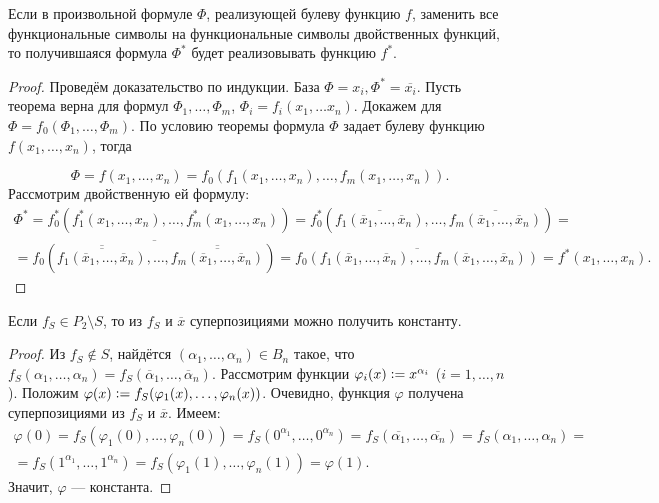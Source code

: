 \begin{theorem}
    Если в произвольной формуле $\Phi$, реализующей булеву функцию $f$, заменить все функциональные символы на функциональные символы двойственных функций, то получившаяся формула $\Phi^\ast$ будет реализовывать функцию $f^\ast$.
\end{theorem}

\begin{proof}
    Проведём доказательство по индукции. База $\Phi = x_i, \Phi^\ast = \overline{x_i}$. Пусть теорема верна для формул $\Phi_1, \ldots, \Phi_m$, $\Phi_i = f_i(x_1,\ldots x_n)$. Докажем для $\Phi = f_0(\Phi_1, \ldots, \Phi_m)$.
    По условию теоремы формула $\Phi$ задает булеву функцию $f(x_1, \ldots, x_n)$, тогда

    \[\Phi = f(x_1, \ldots, x_n) = f_0(f_1(x_1, \ldots, x_n), \ldots, f_m(x_1, \ldots, x_n)).\]
    Рассмотрим двойственную ей формулу:
    \begin{multline*}
        \Phi^\ast = f_0^\ast (f_1^\ast(x_1, \ldots, x_n), \ldots, f_m^\ast(x_1, \ldots, x_n)) = f_0^\ast (\overline{f_1(\overline{x}_1, \ldots, \overline{x}_n)}, \ldots, \overline{f_m(\overline{x}_1, \ldots, \overline{x}_n)}) = \\ = \overline{f_0(\overline{\overline{f_1(\overline{x}_1, \ldots, \overline{x}_n)}}, \ldots, \overline{\overline{f_m(\overline{x}_1, \ldots, \overline{x}_n)}})} = \overline{f_0(f_1(\overline{x}_1, \ldots, \overline{x}_n), \ldots, f_m(\overline{x}_1, \ldots, \overline{x}_n))} = f^\ast(x_1,\ldots, x_n).
    \end{multline*}
\end{proof}

\begin{lemma}
    Если $f_S \in P_2 \setminus S$, то из $f_S$ и $\overline{x}$ суперпозициями можно получить константу.
\end{lemma}

\begin{proof}
    Из $f_S \notin S$, найдётся $(\alpha_1, \ldots, \alpha_n) \in B_n$ такое, что $f_S(\alpha_1, \ldots, \alpha_n) = f_S(\overline{\alpha}_1, \ldots, \overline{\alpha}_n)$. Рассмотрим функции $\varphi_i(x) \vcentcolon = x^{\alpha_i}$ ($i = 1, \ldots, n$). Положим $\varphi(x) \vcentcolon = f_S(\varphi_1(x), \ldots, \varphi_n(x))$. Очевидно, функция $\varphi$ получена суперпозициями из $f_S$ и $\overline{x}$. Имеем:
    \begin{multline*}
        \varphi(0) = f_S(\varphi_1(0), \ldots, \varphi_n(0)) = f_S(0^{\alpha_1}, \ldots, 0^{\alpha_n}) = f_S(\overline{\alpha_1}, \ldots, \overline{\alpha_n}) = f_S(\alpha_1, \ldots, \alpha_n) =\\ = f_S(1^{\alpha_1}, \ldots, 1^{\alpha_n}) = f_S(\varphi_1(1), \ldots, \varphi_n(1)) = \varphi(1).
    \end{multline*}
    Значит, $\varphi$ --- константа.
\end{proof}

